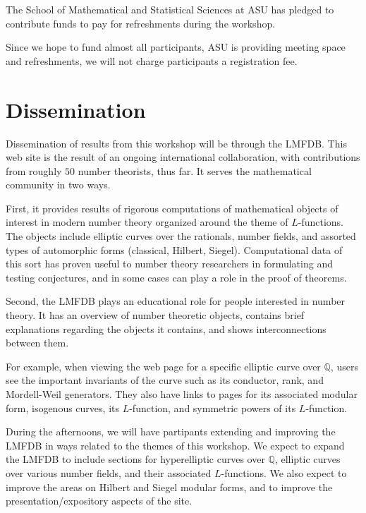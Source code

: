 \documentclass[12pt]{amsart}
\numberwithin{equation}{section}
\newcommand{\Q}{\mathbb Q}
\begin{document}
The School of Mathematical and Statistical Sciences at ASU has pledged to
contribute funds to pay for refreshments during the workshop.

Since we hope to fund almost all participants, ASU is providing
meeting space and refreshments, we will not charge participants a
registration fee.


\section{Dissemination}

Dissemination of results from this workshop will be through the
\textsf{LMFDB}.  This web site is the result of an ongoing international
collaboration, with contributions from roughly $50$ number theorists,
thus far.  It serves the mathematical community in two ways.

First, it provides results of rigorous computations of mathematical
objects of interest in modern number theory organized around the theme
of $L$-functions.  The objects include elliptic curves over the
rationals, number fields, and assorted types of automorphic forms
(classical, Hilbert, Siegel).  Computational data of this sort has
proven useful to number theory researchers in formulating and testing
conjectures, and in some cases can play a role in the proof of
theorems.

Second, the \textsf{LMFDB} plays an educational role for people interested in
number theory.  It has an overview of number theoretic objects,
contains brief explanations regarding the objects it contains, and
shows interconnections between them.  

For example, when viewing the web page for a specific elliptic curve
over $\Q$, users see the important invariants of the curve such as its
conductor, rank, and Mordell-Weil generators.  They also have links to
pages for its associated modular form, isogenous curves, its
$L$-function, and symmetric powers of its $L$-function.

During the afternoons, we will have partipants extending and improving
the \textsf{LMFDB} in ways related to the themes of this workshop.  We expect
to expand the \textsf{LMFDB} to include sections for hyperelliptic curves over
$\Q$, elliptic curves over various number fields, and their
associated $L$-functions.  We also expect to improve the areas on
Hilbert and Siegel modular forms, and to improve the
presentation/expository aspects of the site.
\end{document}
